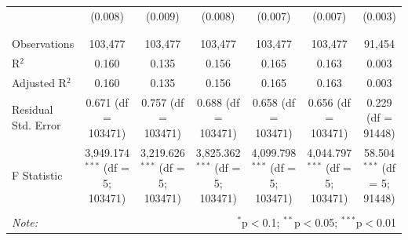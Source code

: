 \begin{table}[!htbp]
\begin{tabular}{@{\extracolsep{5pt}}lcccccc}
  & (0.008) & (0.009) & (0.008) & (0.007) & (0.007) & (0.003) \\ 
  & & & & & & \\ 
\hline \\[-1.8ex] 
Observations & 103,477 & 103,477 & 103,477 & 103,477 & 103,477 & 91,454 \\ 
R$^{2}$ & 0.160 & 0.135 & 0.156 & 0.165 & 0.163 & 0.003 \\ 
Adjusted R$^{2}$ & 0.160 & 0.135 & 0.156 & 0.165 & 0.163 & 0.003 \\ 
Residual Std. Error & 0.671 (df = 103471) & 0.757 (df = 103471) & 0.688 (df = 103471) & 0.658 (df = 103471) & 0.656 (df = 103471) & 0.229 (df = 91448) \\ 
F Statistic & 3,949.174$^{***}$ (df = 5; 103471) & 3,219.626$^{***}$ (df = 5; 103471) & 3,825.362$^{***}$ (df = 5; 103471) & 4,099.798$^{***}$ (df = 5; 103471) & 4,044.797$^{***}$ (df = 5; 103471) & 58.504$^{***}$ (df = 5; 91448) \\ 
\hline 
\hline \\[-1.8ex] 
\textit{Note:}  & \multicolumn{6}{r}{$^{*}$p$<$0.1; $^{**}$p$<$0.05; $^{***}$p$<$0.01} \\ 
\end{tabular} 
\end{table} 
